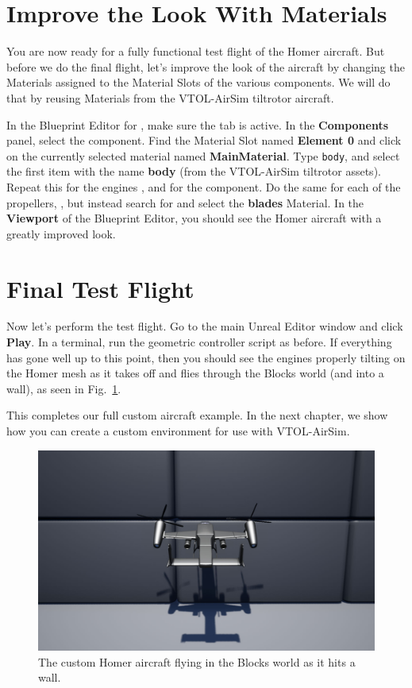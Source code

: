\section{Improve the Look With Materials}
You are now ready for a fully functional test flight of the Homer aircraft. But before we do the final flight, let's improve the look of the aircraft by changing the Materials assigned to the Material Slots of the various components. We will do that by reusing Materials from the VTOL-AirSim tiltrotor aircraft.

In the Blueprint Editor for , make sure the  tab is active. In the \textbf{Components} panel, select the  component. Find the Material Slot named \textbf{Element 0} and click on the currently selected material named \textbf{MainMaterial}. Type \texttt{body}, and select the first item with the name \textbf{body} (from the VTOL-AirSim tiltrotor assets). Repeat this for the engines , and for the  component. Do the same for each of the propellers, , but instead search for and select the \textbf{blades} Material. In the \textbf{Viewport} of the Blueprint Editor, you should see the Homer aircraft with a greatly improved look.

\section{Final Test Flight}
Now let's perform the test flight. Go to the main Unreal Editor window and click \textbf{Play}. In a terminal, run the geometric controller script as before. If everything has gone well up to this point, then you should see the engines properly tilting on the Homer mesh as it takes off and flies through the Blocks world (and into a wall), as seen in Fig.~\ref{fig:homerpawn_flight}.

This completes our full custom aircraft example. In the next chapter, we show how you can create a custom environment for use with VTOL-AirSim.

\begin{figure}[h]
    \centering
    \includegraphics[width=\textwidth]{figures/homerpawn_final_flight}
    \caption[Custom aircraft flying in VTOL-AirSim]{
        The custom Homer aircraft flying in the Blocks world as it hits a wall.}%
    \label{fig:homerpawn_flight}
\end{figure}

